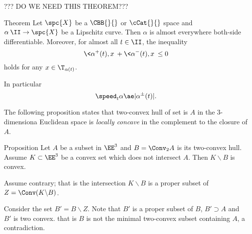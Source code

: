 ??? DO WE NEED THIS THEOREM???


\begin{thm}{Theorem}\label{thm:differentiability-of-curves}
Let $\spc{X}$ be a $\CBB{}{}$ or $\cCat{}{}$ space
and $\alpha\:\II\to\spc{X}$ be a Lipschitz curve. 
Then $\alpha$ is almost everywhere both-side differentiable.
Moreover,
for almost all $t\in\II$,
the inequality 
\[\<\alpha^+(t),x\>+\<\alpha^-(t),x\>\le 0\]
holds for any $x\in \T_{\alpha(t)}$.

In particular
\[\speed_t\alpha
\ae
|\alpha^\pm(t)|.\]
\end{thm}






































The following proposition states that two-convex hull of set is $A$ in the 3-dimensiona Euclidean space
is \emph{locally concave} in the complement to the closure of $A$. 

\begin{thm}{Proposition}
Let $A$ be a subset in $\EE^3$
and $B=\Conv_2 A$ is its two-convex hull.
Assume $K\subset \EE^3$ be a convex set which does not intersect $A$.
Then $K\backslash B$ is convex.
\end{thm}

Assume contrary; 
that is the intersection $K\backslash B$ is a proper subset of $Z=\Conv(K\backslash B)$.

Consider the set $B'=B\backslash Z$. 
Note that $B'$ is a proper subset of $B$,
$B'\supset A$ and $B'$ is two convex.
that is $B$ is not the minimal two-convex subset containing $A$,
a contradiction.
\qeds
























